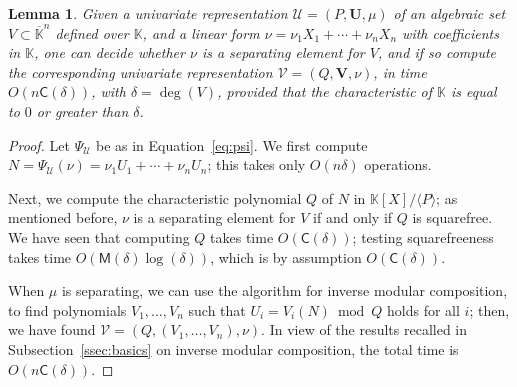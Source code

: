 \documentclass[12pt]{article}
\def\CC {\ensuremath{\mathsf{C}}}
\def\K {\ensuremath{\mathbb{K}}}
\def\Kbar {\ensuremath{\overline{\mathbb{K}}}}
\def\M {\ensuremath{\mathsf{M}}}
\def\Uu {\ensuremath{\mathbf{U}}}
\def\Vv {\ensuremath{\mathbf{V}}}
\def\Ur {\ensuremath{\mathscr U}}
\def\Vr {\ensuremath{\mathscr V}}
\newtheorem{Lemma}{Lemma}
\begin{document}
\begin{Lemma}\label{lemma:change}
  Given a univariate representation $\Ur=(P,\Uu,\mu)$ of an algebraic
  set $V \subset\Kbar^n$ defined over $\K$, and a linear form
  $\nu=\nu_1 X_1 + \cdots + \nu_n X_n$ with coefficients in $\K$, one
  can decide whether $\nu$ is a separating element for $V$, and if so
  compute the corresponding univariate representation
  $\Vr=(Q,\Vv,\nu)$, in time $O(n \CC(\delta))$, with
  $\delta=\deg(V)$, provided that the characteristic of $\K$ is equal
  to $0$ or greater than $\delta$.
\end{Lemma}
\begin{proof}
  Let $\Psi_{\Ur}$ be as in Equation~\eqref{eq:psi}. We first compute
  $N=\Psi_{\Ur}(\nu)=\nu_1 U_1 + \cdots + \nu_n U_n$; this takes only
  $O(n\delta)$ operations.

  Next, we compute the characteristic polynomial $Q$ of $N$ in
  $\K[X]/\langle P\rangle$; as mentioned before, $\nu$ is a separating
  element for $V$ if and only if $Q$ is squarefree. We have seen that
  computing $Q$ takes time $O(\CC(\delta))$; testing squarefreeness
  takes time $O(\M(\delta)\log(\delta))$, which is by assumption
  $O(\CC(\delta))$.

  When $\mu$ is separating, we can use the algorithm for inverse
  modular composition, to find polynomials $V_1,\dots,V_n$ such that
  $U_i=V_i(N) \bmod Q$ holds for all $i$; then, we have found
  $\Vr=(Q,(V_1,\dots,V_n),\nu)$. In view of the results recalled in
  Subsection~\ref{ssec:basics} on inverse modular composition, the
  total time is $O(n \CC(\delta))$.
\end{proof}
\end{document}

